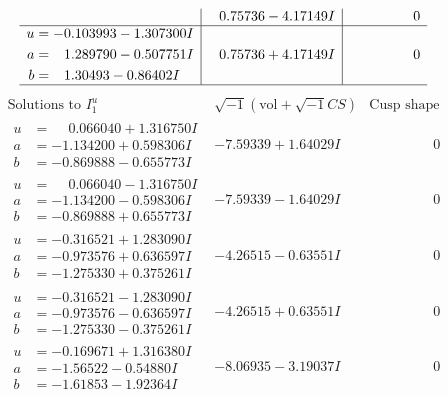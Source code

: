 \documentclass[1p]{elsarticle_modified}
\theoremstyle{definition}
\newcommand{\I}{\sqrt{-1}}
\begin{document}
$$\begin{array}{c|c|c}
 & \phantom{-}0.75736 - 4.17149 I & \phantom{-0.000000 } 0 \\ \hline\begin{aligned}
u &= -0.103993 - 1.307300 I \\
a &= \phantom{-}1.289790 - 0.507751 I \\
b &= \phantom{-}1.30493 - 0.86402 I\end{aligned}
 & \phantom{-}0.75736 + 4.17149 I & \phantom{-0.000000 } 0\\
 \hline 
 \end{array}$$\newpage$$\begin{array}{c|c|c}  
\text{Solutions to }I^u_{1}& \I (\text{vol} + \sqrt{-1}CS) & \text{Cusp shape}\\
 \hline 
\begin{aligned}
u &= \phantom{-}0.066040 + 1.316750 I \\
a &= -1.134200 + 0.598306 I \\
b &= -0.869888 - 0.655773 I\end{aligned}
 & -7.59339 + 1.64029 I & \phantom{-0.000000 } 0 \\ \hline\begin{aligned}
u &= \phantom{-}0.066040 - 1.316750 I \\
a &= -1.134200 - 0.598306 I \\
b &= -0.869888 + 0.655773 I\end{aligned}
 & -7.59339 - 1.64029 I & \phantom{-0.000000 } 0 \\ \hline\begin{aligned}
u &= -0.316521 + 1.283090 I \\
a &= -0.973576 + 0.636597 I \\
b &= -1.275330 + 0.375261 I\end{aligned}
 & -4.26515 - 0.63551 I & \phantom{-0.000000 } 0 \\ \hline\begin{aligned}
u &= -0.316521 - 1.283090 I \\
a &= -0.973576 - 0.636597 I \\
b &= -1.275330 - 0.375261 I\end{aligned}
 & -4.26515 + 0.63551 I & \phantom{-0.000000 } 0 \\ \hline\begin{aligned}
u &= -0.169671 + 1.316380 I \\
a &= -1.56522 - 0.54880 I \\
b &= -1.61853 - 1.92364 I\end{aligned}
 & -8.06935 - 3.19037 I & \phantom{-0.000000 } 0 \\ \hline\begin{aligned}

\end{aligned}
\end{array}$$
\end{document}
